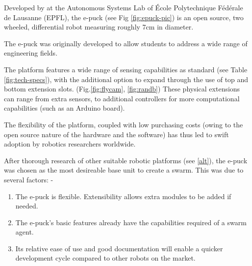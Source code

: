 Developed by \citeauthor{epfl-epuck} at the Autonomous Systems Lab of \'{E}cole Polytechnique F\'{e}d\'{e}rale de Lausanne (EPFL), the e-puck (see Fig \ref{fig:epuck-pic}) is  an open source, two wheeled, differential robot measuring roughly 7cm in diameter. \cite{epfl-epuck}

The e-puck was originally developed to allow students to address a wide range of engineering fields. 

The platform features a wide range of sensing capabilities as standard (see Table \ref{fig:tech-specs}), with the additional option to expand through the use of top and bottom extension slots. (Fig.\ref{fig:flycam}, \ref{fig:randb}) These physical extensions can range from extra sensors, to additional controllers for more computational capabilities (such as an Arduino board).

The flexibility of the platform, coupled with low purchasing costs (owing to the open source nature of the hardware and the software) has thus led to swift adoption by robotics researchers worldwide.
\clearpage

After thorough research of other suitable robotic platforms (see \ref{alt}), the e-puck was chosen as the most desireable base unit to create a swarm. This was due to several factors: -

\begin{enumerate}
	\item The e-puck is flexible. Extensibility allows extra modules to be added if needed.
	\item The e-puck's basic features already have the capabilities required of a swarm agent.
	\item Its relative ease of use and good documentation will enable a quicker development cycle compared to other robots on the market.
\end{enumerate}



